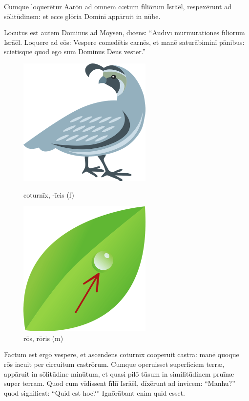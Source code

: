 Cumque loquerētur Aarōn ad omnem cœtum fīliōrum Isrāēl, respexērunt ad sōlitūdinem: et ecce glōria Dominī appāruit in nūbe.

Locūtus est autem Dominus ad Moysen, dīcēns: ``Audīvī murmurātiōnēs
fīliōrum Isrāēl. Loquere ad eōs: Vespere comedētis carnēs, et manē
saturābiminī pānibus: sciētisque quod ego sum Dominus Deus
vester.''

\begin{figure}[h!]
    \begin{minipage}[hp]{0.5\linewidth}
        \centering
        \includegraphics{quail}
        \caption{coturnīx, -īcis (f)}
    \end{minipage}%
    \begin{minipage}[hp]{0.5\linewidth}
        \centering
        \includegraphics{dew}
        \caption{rōs, rōris (m)}
    \end{minipage}
\end{figure}

Factum est ergō vespere, et ascendēns coturnīx
cooperuit castra: manē 
quoque rōs iacuit per circuitum castrōrum. Cumque operuisset superficiem
terræ, appāruit in
sōlitūdine minūtum, et quasi  pilō tūsum in
similitūdinem pruīnæ super terram. Quod
cum vīdissent fīliī Isrāēl, dīxērunt ad invicem: ``Manhu?'' quod significat: ``Quid est
hoc?'' Ignōrābant enim quid esset. 

